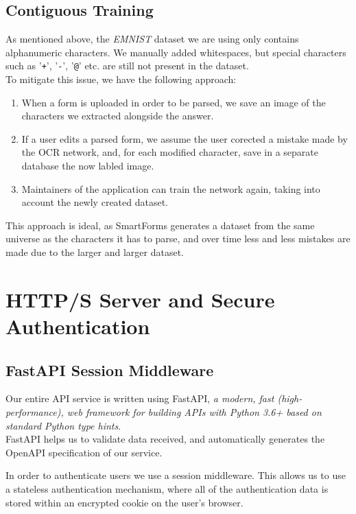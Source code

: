 \documentclass[11pt, a4paper]{report}
\def\code#1{\texttt{#1}}
\begin{document}
\section{Contiguous Training}

As mentioned above, the \textit{EMNIST} dataset we are using only contains alphanumeric characters. We manually added whitespaces, but special characters such as '\code{+}', '\code{-}', '\code{@}' etc. are still not present in the dataset.
\\
To mitigate this issue, we have the following approach:
\begin{enumerate}
	\item When a form is uploaded in order to be parsed, we save an image of the characters we extracted alongside the answer.
	\item If a user edits a parsed form, we assume the user corected a mistake made by the OCR network, and, for each modified character, save in a separate database the now labled image.
	\item Maintainers of the application can train the network again, taking into account the newly created dataset.
\end{enumerate}

This approach is ideal, as SmartForms generates a dataset from the same universe as the characters it has to parse, and over time less and less mistakes are made due to the larger and larger dataset.

\chapter{HTTP/S Server and Secure Authentication}

\section{FastAPI Session Middleware}

Our entire API service is written using FastAPI, \textit{a modern, fast (high-performance), web framework for building APIs with Python 3.6+ based on standard Python type hints}\cite{FastAPI}.
\\
FastAPI helps us to validate data received, and automatically generates the OpenAPI\cite{open-api} specification of our service.

In order to authenticate users we use a session middleware. This allows us to use a stateless authentication mechanism, where all of the authentication data is stored within an encrypted cookie on the user's browser.
\end{document}
